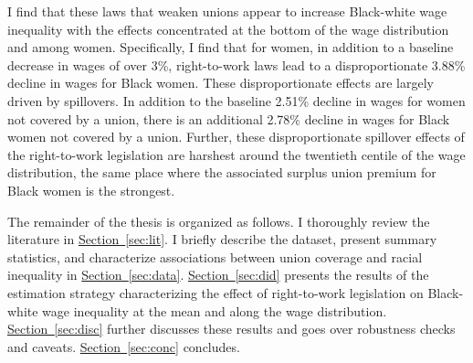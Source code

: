 \documentclass[11pt]{article}
\begin{document}
I find that these laws that weaken unions appear to increase Black-white wage inequality with the effects concentrated at the bottom of the wage distribution and among women. Specifically, I find that for women, in addition to a baseline decrease in wages of over 3\%, right-to-work laws lead to a disproportionate 3.88\% decline in wages for Black women. These disproportionate effects are largely driven by spillovers. In addition to the baseline 2.51\% decline in wages for women not covered by a union, there is an additional 2.78\% decline in wages for Black women not covered by a union. Further, these disproportionate spillover effects of the right-to-work legislation are harshest around the twentieth centile of the wage distribution, the same place where the associated surplus union premium for Black women is the strongest.

The remainder of the thesis is organized as follows. I thoroughly review the literature in \hyperref[sec:lit]{Section~\ref*{sec:lit}}. I briefly describe the dataset, present summary statistics, and characterize associations between union coverage and racial inequality in \hyperref[sec:data]{Section~\ref*{sec:data}}. \hyperref[sec:did]{Section~\ref*{sec:did}} presents the results of the estimation strategy characterizing the effect of right-to-work legislation on Black-white wage inequality at the mean and along the wage distribution. \hyperref[sec:disc]{Section~\ref*{sec:disc}} further discusses these results and goes over robustness checks and caveats. \hyperref[sec:conc]{Section~\ref*{sec:conc}} concludes.

\end{document}

